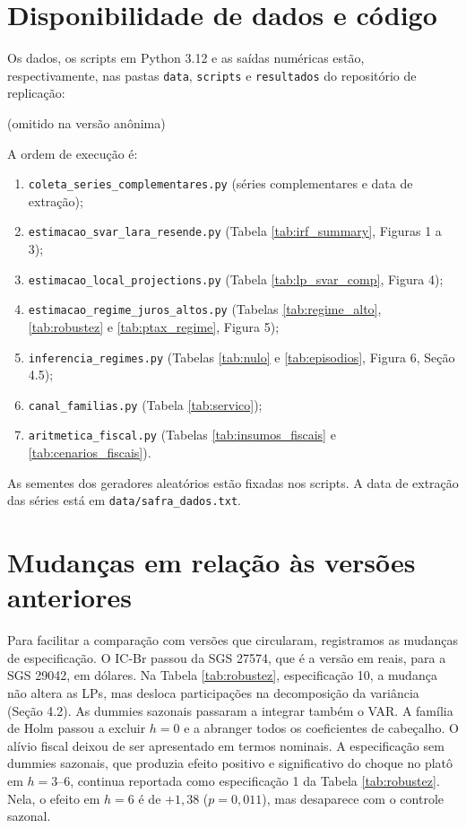 \documentclass[12pt,a4paper]{article}
\newif\ifanonimo
\newcommand{\repositorio}{(omitido na versão anônima)}
\newcommand{\repositorio}{\url{https://github.com/bonvenuto/artigo-politica-monetaria}}
\begin{document}
\appendix
\section{Disponibilidade de dados e código}

Os dados, os scripts em Python 3.12 e as saídas numéricas estão, respectivamente, nas pastas \texttt{data}, \texttt{scripts} e \texttt{resultados} do repositório de replicação:
\begin{center}\repositorio\end{center}
A ordem de execução é:
\begin{enumerate}
    \item \texttt{coleta\_series\_complementares.py} (séries complementares e data de extração);
    \item \texttt{estimacao\_svar\_lara\_resende.py} (Tabela \ref{tab:irf_summary}, Figuras 1 a 3);
    \item \texttt{estimacao\_local\_projections.py} (Tabela \ref{tab:lp_svar_comp}, Figura 4);
    \item \texttt{estimacao\_regime\_juros\_altos.py} (Tabelas \ref{tab:regime_alto}, \ref{tab:robustez} e \ref{tab:ptax_regime}, Figura 5);
    \item \texttt{inferencia\_regimes.py} (Tabelas \ref{tab:nulo} e \ref{tab:episodios}, Figura 6, Seção 4.5);
    \item \texttt{canal\_familias.py} (Tabela \ref{tab:servico});
    \item \texttt{aritmetica\_fiscal.py} (Tabelas \ref{tab:insumos_fiscais} e \ref{tab:cenarios_fiscais}).
\end{enumerate} As sementes dos geradores aleatórios estão fixadas nos scripts. A data de extração das séries está em \texttt{data/safra\_dados.txt}.

\ifanonimo\else
\section{Mudanças em relação às versões anteriores}

Para facilitar a comparação com versões que circularam, registramos as mudanças de especificação. O IC-Br passou da SGS 27574, que é a versão em reais, para a SGS 29042, em dólares. Na Tabela \ref{tab:robustez}, especificação 10, a mudança não altera as LPs, mas desloca participações na decomposição da variância (Seção 4.2). As dummies sazonais passaram a integrar também o VAR. A família de Holm passou a excluir $h = 0$ e a abranger todos os coeficientes de cabeçalho. O alívio fiscal deixou de ser apresentado em termos nominais. A especificação sem dummies sazonais, que produzia efeito positivo e significativo do choque no platô em $h = 3$--$6$, continua reportada como especificação 1 da Tabela \ref{tab:robustez}. Nela, o efeito em $h = 6$ é de $+1{,}38$ ($p = 0{,}011$), mas desaparece com o controle sazonal.
\fi

\newpage


\end{document}
